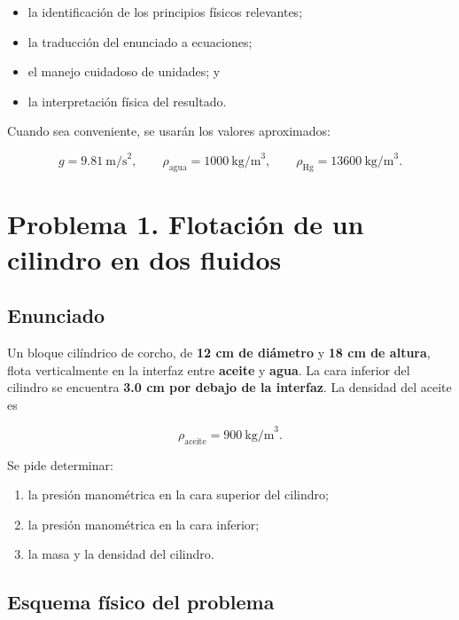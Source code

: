 \documentclass[
  letterpaper,
  DIV=11,
  numbers=noendperiod]{scrreprt}
\providecommand{\tightlist}{%
  \setlength{\itemsep}{0pt}\setlength{\parskip}{0pt}}
\begin{document}
\begin{itemize}
\tightlist
\item
  la identificación de los principios físicos relevantes;
\item
  la traducción del enunciado a ecuaciones;
\item
  el manejo cuidadoso de unidades; y
\item
  la interpretación física del resultado.
\end{itemize}

Cuando sea conveniente, se usarán los valores aproximados:

\[
g = 9.81\ \text{m/s}^2,
\qquad
\rho_{\text{agua}} = 1000\ \text{kg/m}^3,
\qquad
\rho_{\text{Hg}} = 13600\ \text{kg/m}^3.
\]

\chapter{Problema 1. Flotación de un cilindro en dos
fluidos}\label{problema-1.-flotaciuxf3n-de-un-cilindro-en-dos-fluidos}

\section*{Enunciado}\label{enunciado}


Un bloque cilíndrico de corcho, de \textbf{12 cm de diámetro} y
\textbf{18 cm de altura}, flota verticalmente en la interfaz entre
\textbf{aceite} y \textbf{agua}. La cara inferior del cilindro se
encuentra \textbf{3.0 cm por debajo de la interfaz}. La densidad del
aceite es

\[
\rho_{\text{aceite}}=900\ \text{kg/m}^3.
\]

Se pide determinar:

\begin{enumerate}
\def\labelenumi{\alph{enumi})}
\item
  la presión manométrica en la cara superior del cilindro;
\item
  la presión manométrica en la cara inferior;
\item
  la masa y la densidad del cilindro.
\end{enumerate}

\section*{Esquema físico del
problema}\label{esquema-fuxedsico-del-problema}
\end{document}
